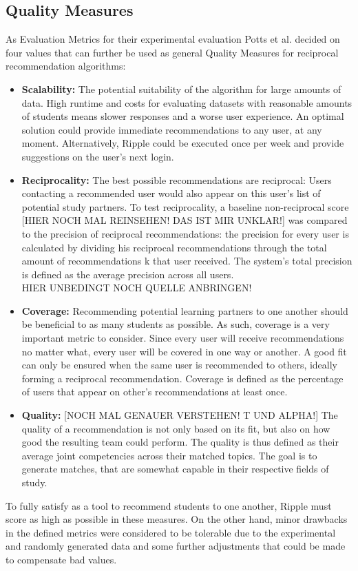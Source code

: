 \documentclass[nochapterpage,bigchapter,linedtoc,longdoc,colorback,accentcolor=tud3b]{tudreport}
\begin{document}
\subsection{Quality Measures}
As Evaluation Metrics for their experimental evaluation Potts et al. decided on four values that can further be used as general Quality Measures for reciprocal recommendation algorithms:\\
[DAS HIER BESSER ALS EIGENE Subsubsections? ODER BEI DEN ERGEBNISSEN? ODER HIER NUR NAMEDROPPEN UND SPÄTER ERKLÄREN?]
\begin{itemize}
	\item \textbf{Scalability:} The potential suitability of the algorithm for large amounts of data. High runtime and costs for evaluating datasets with reasonable amounts of students means slower responses and a worse user experience. An optimal solution could provide immediate recommendations to any user, at any moment. Alternatively, Ripple could be executed once per week and provide suggestions on the user's next login.\\
	\item \textbf{Reciprocality:} The best possible recommendations are reciprocal: Users contacting a recommended user would also appear on this user's list of potential study partners. To test reciprocality, a baseline non-reciprocal score [HIER NOCH MAL REINSEHEN! DAS IST MIR UNKLAR!] was compared to the precision of reciprocal recommendations: the precision for every user is calculated by dividing his reciprocal recommendations through the total amount of recommendations k that user received. The system's total precision is defined as the average precision across all users.\\ HIER UNBEDINGT NOCH QUELLE ANBRINGEN!
	\item \textbf{Coverage:} Recommending potential learning partners to one another should be beneficial to as many students as possible. As such, coverage is a very important metric to consider. Since every user will receive recommendations no matter what, every user will be covered in one way or another. A good fit can only be ensured when the same user is recommended to others, ideally forming a reciprocal recommendation. Coverage is defined as the percentage of users that appear on other's recommendations at least once.\\
	\item \textbf{Quality:} [NOCH MAL GENAUER VERSTEHEN! T UND ALPHA!] The quality of a recommendation is not only based on its fit, but also on how good the resulting team could perform. The quality is thus defined as their average joint competencies across their matched topics. The goal is to generate matches, that are somewhat capable in their respective fields of study.\\
\end{itemize}
To fully satisfy as a tool to recommend students to one another, Ripple must score as high as possible in these measures. On the other hand, minor drawbacks in the defined metrics were considered to be tolerable due to the experimental and randomly generated data and some further adjustments that could be made to compensate bad values.\\
\end{document}
